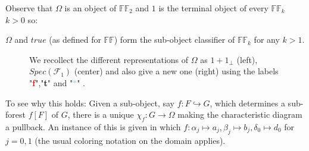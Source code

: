 Observe that $\Omega$ is an object of $\mathbb{FF}_2$ and $1$ is the terminal object of every $\mathbb{FF}_k$ $k>0$ so:

\begin{cor}\label{cor:subobjcl}
	$\Omega$ and $true$ (as defined for $\mathbb{FF}$) form the sub-object classifier of $\mathbb{FF}_k$ for any $k>1$.
\end{cor}

\begin{figure}[h]
	\centering
{}
\caption{We recollect the different representations of $\Omega$ as $1+1_\bot$ (left), $Spec(\mathcal{F}_1)$ (center) and also give a new one (right) using the labels "\textcolor{red}{\textbf{f}}","\textcolor{OliveGreen}{\textbf{t}}" and "\textcolor{SkyBlue}{$*$}" .}
\end{figure}
\newpage
To see why this holds:\newline
Given a sub-object, say $f: F \hookrightarrow G$, which determines a sub-forest $f[F]$ of $G$, there is a unique $\chi_f: G \rightarrow \Omega $ making the characteristic diagram a pullback. 
\newline
An instance of this is given in which $f : \alpha_j \mapsto a_j, \beta_j \mapsto b_j,  \delta_0 \mapsto d_0$ for $ j=0,1 $ (the usual coloring notation on the domain applies).

